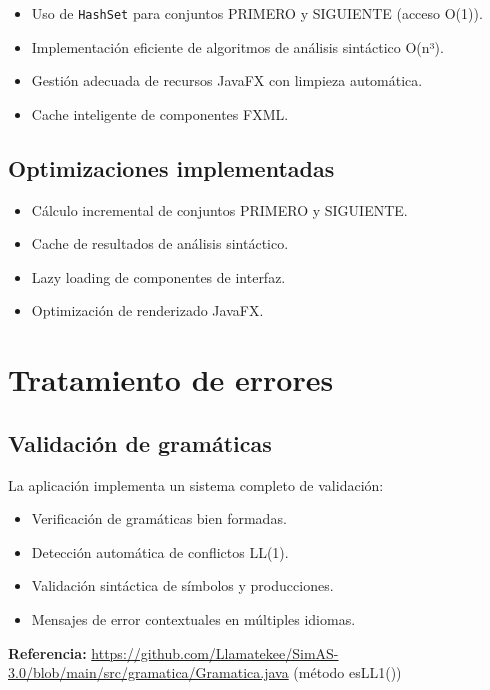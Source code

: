 \begin{itemize}
    \item Uso de \texttt{HashSet} para conjuntos PRIMERO y SIGUIENTE (acceso O(1)).
    \item Implementación eficiente de algoritmos de análisis sintáctico O(n³).
    \item Gestión adecuada de recursos JavaFX con limpieza automática.
    \item Cache inteligente de componentes FXML.
\end{itemize}

\subsection{Optimizaciones implementadas}

\begin{itemize}
    \item Cálculo incremental de conjuntos PRIMERO y SIGUIENTE.
    \item Cache de resultados de análisis sintáctico.
    \item Lazy loading de componentes de interfaz.
    \item Optimización de renderizado JavaFX.
\end{itemize}

\section{Tratamiento de errores}

\subsection{Validación de gramáticas}

La aplicación implementa un sistema completo de validación:

\begin{itemize}
    \item Verificación de gramáticas bien formadas.
    \item Detección automática de conflictos LL(1).
    \item Validación sintáctica de símbolos y producciones.
    \item Mensajes de error contextuales en múltiples idiomas.
\end{itemize}

\textbf{Referencia:} \url{https://github.com/Llamatekee/SimAS-3.0/blob/main/src/gramatica/Gramatica.java} (método esLL1())

